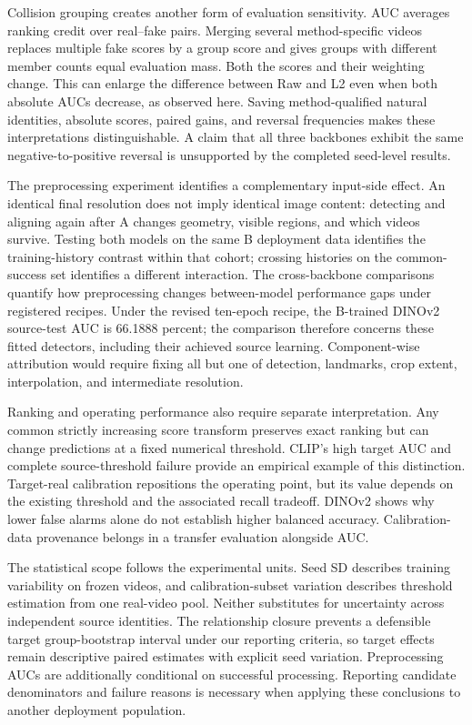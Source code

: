 \documentclass{ieeeaccess}
\begin{document}
Collision grouping creates another form of evaluation sensitivity. AUC
averages ranking credit over real--fake pairs. Merging several
method-specific videos replaces multiple fake scores by a group score
and gives groups with different member counts equal evaluation mass.
Both the scores and their weighting change. This can enlarge the
difference between Raw and L2 even when both absolute AUCs decrease, as
observed here. Saving method-qualified natural identities, absolute
scores, paired gains, and reversal frequencies makes these
interpretations distinguishable. A claim that all three backbones
exhibit the same negative-to-positive reversal is unsupported by the
completed seed-level results.

The preprocessing experiment identifies a complementary input-side
effect. An identical final resolution does not imply identical image
content: detecting and aligning again after A changes geometry, visible
regions, and which videos survive. Testing both models on the same B
deployment data identifies the training-history contrast within that
cohort; crossing histories on the common-success set identifies a
different interaction. The cross-backbone comparisons quantify how
preprocessing changes between-model performance gaps under registered
recipes. Under the revised ten-epoch recipe, the B-trained DINOv2
source-test AUC is 66.1888 percent; the comparison therefore concerns
these fitted detectors, including their achieved source learning.
Component-wise attribution would require fixing all but one of
detection, landmarks, crop extent, interpolation, and intermediate
resolution.

Ranking and operating performance also require separate interpretation.
Any common strictly increasing score transform preserves exact ranking
but can change predictions at a fixed numerical threshold. CLIP's high
target AUC and complete source-threshold failure provide an empirical
example of this distinction. Target-real calibration repositions the
operating point, but its value depends on the existing threshold and the
associated recall tradeoff. DINOv2 shows why lower false alarms alone do
not establish higher balanced accuracy. Calibration-data provenance
belongs in a transfer evaluation alongside AUC.

The statistical scope follows the experimental units. Seed SD describes
training variability on frozen videos, and calibration-subset variation
describes threshold estimation from one real-video pool. Neither
substitutes for uncertainty across independent source identities. The
relationship closure prevents a defensible target group-bootstrap
interval under our reporting criteria, so target effects remain
descriptive paired estimates with explicit seed variation. Preprocessing
AUCs are additionally conditional on successful processing. Reporting
candidate denominators and failure reasons is necessary when applying
these conclusions to another deployment population.
\end{document}
